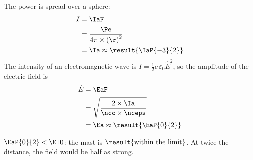 \begin{abcliste}
\abc The power is spread over a sphere:
\begin{align}
 I &= \IaF \\
   &= \frac{\Pe}{4\pi\times\left(\r\right)^2} \\
   &= \Ia \approx \result{\IaP{-3}{2}}
\end{align}
The intensity of an electromagnetic wave is $I = \frac{1}{2}c\,\varepsilon_0\hat E^2$, so the amplitude of the electric field is
\begin{align}
 \hat E &= \EaF \\
   &= \sqrt{\frac{2\times\Ia}{\ncc\times\nceps}} \\
   &= \Ea \approx \result{\EaP{0}{2}}
\end{align}

\abc $\EaP{0}{2} < \ElO$: the mast is $\result{\text{within the limit}}$. At twice the distance, the field would be half as strong.
\end{abcliste}
